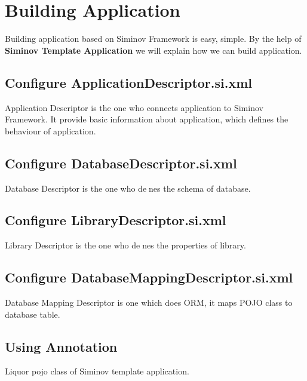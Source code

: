 \newpage
\chapter {\Large{Building Application}}
Building application based on Siminov Framework is easy, simple. By the help of \textbf{Siminov Template Application} we will explain how we can build application.


\section{Configure ApplicationDescriptor.si.xml}
Application Descriptor is the one who connects application to Siminov Framework. It provide basic information about application, which defines the behaviour of application.

	



\section{Configure DatabaseDescriptor.si.xml}
Database Descriptor is the one who denes the schema of database.

	


\section{Configure LibraryDescriptor.si.xml}
Library Descriptor is the one who denes the properties of library.


	


\section{Configure DatabaseMappingDescriptor.si.xml}
Database Mapping Descriptor is one which does ORM, it maps POJO class to database table.

	



\section{Using Annotation}
Liquor pojo class of Siminov template application.

